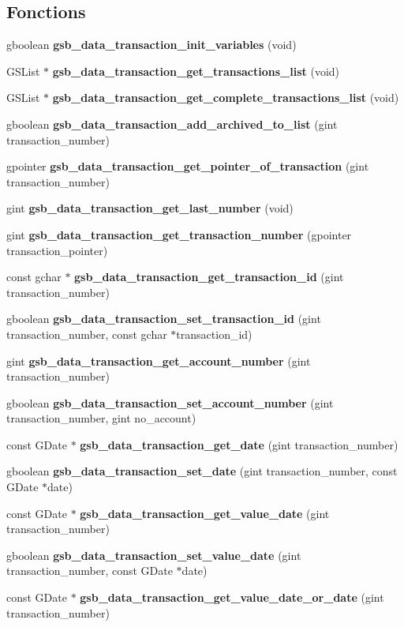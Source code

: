 \subsection*{Fonctions}
\begin{DoxyCompactItemize}
\item 
gboolean {\bf gsb\_\-data\_\-transaction\_\-init\_\-variables} (void)
\item 
GSList $\ast$ {\bf gsb\_\-data\_\-transaction\_\-get\_\-transactions\_\-list} (void)
\item 
GSList $\ast$ {\bf gsb\_\-data\_\-transaction\_\-get\_\-complete\_\-transactions\_\-list} (void)
\item 
gboolean {\bf gsb\_\-data\_\-transaction\_\-add\_\-archived\_\-to\_\-list} (gint transaction\_\-number)
\item 
gpointer {\bf gsb\_\-data\_\-transaction\_\-get\_\-pointer\_\-of\_\-transaction} (gint transaction\_\-number)
\item 
gint {\bf gsb\_\-data\_\-transaction\_\-get\_\-last\_\-number} (void)
\item 
gint {\bf gsb\_\-data\_\-transaction\_\-get\_\-transaction\_\-number} (gpointer transaction\_\-pointer)
\item 
const gchar $\ast$ {\bf gsb\_\-data\_\-transaction\_\-get\_\-transaction\_\-id} (gint transaction\_\-number)
\item 
gboolean {\bf gsb\_\-data\_\-transaction\_\-set\_\-transaction\_\-id} (gint transaction\_\-number, const gchar $\ast$transaction\_\-id)
\item 
gint {\bf gsb\_\-data\_\-transaction\_\-get\_\-account\_\-number} (gint transaction\_\-number)
\item 
gboolean {\bf gsb\_\-data\_\-transaction\_\-set\_\-account\_\-number} (gint transaction\_\-number, gint no\_\-account)
\item 
const GDate $\ast$ {\bf gsb\_\-data\_\-transaction\_\-get\_\-date} (gint transaction\_\-number)
\item 
gboolean {\bf gsb\_\-data\_\-transaction\_\-set\_\-date} (gint transaction\_\-number, const GDate $\ast$date)
\item 
const GDate $\ast$ {\bf gsb\_\-data\_\-transaction\_\-get\_\-value\_\-date} (gint transaction\_\-number)
\item 
gboolean {\bf gsb\_\-data\_\-transaction\_\-set\_\-value\_\-date} (gint transaction\_\-number, const GDate $\ast$date)
\item 
const GDate $\ast$ {\bf gsb\_\-data\_\-transaction\_\-get\_\-value\_\-date\_\-or\_\-date} (gint transaction\_\-number)

\end{DoxyCompactItemize}
